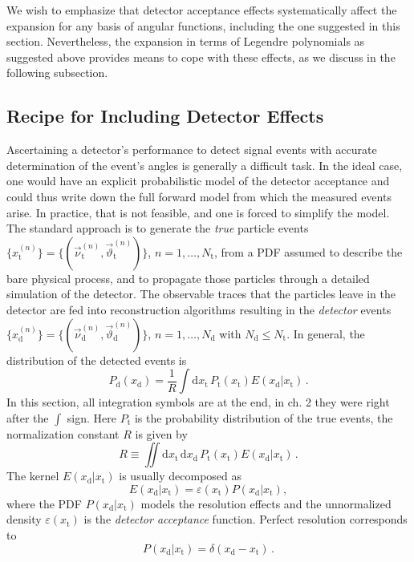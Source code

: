 \documentclass[aps,nofootinbib,preprintnumbers,prd,twocolumn]{revtex4-1}
\newcommand{\rmdx}[1]{\mbox{d} #1 \,} %
\newcommand{\subd}{_{\text{d}}}
\newcommand{\subt}{_{\text{t}}}
\renewcommand{\theta}{\vartheta}
\let\eps\varepsilon
\newcommand{\xd}{x\subd}
\newcommand{\xt}{x\subt}
\newcommand{\Ekernel}{E(\xd|\xt)}
\newcommand{\fred}[1]{{\color{brown!85!black}#1}}
\begin{document}
We wish to emphasize that detector acceptance effects systematically affect the expansion for any basis
of angular functions, including the one suggested in this section.
Nevertheless, the expansion in terms of Legendre polynomials as suggested above provides means to cope with these effects,
as we discuss in the following subsection.


\subsection{Recipe for Including Detector Effects}
\label{sec:systematics:acceptance}

Ascertaining a detector's performance to detect signal events
with accurate determination of the event's angles is generally a
difficult task. In the ideal case, one would have an explicit
probabilistic model of the detector acceptance and could thus
write down the full forward model from which the measured events
arise. In practice, that is not feasible, and one is
forced to simplify the model.
The standard approach is to generate the \emph{true} particle events
$\lbrace x_\text{t}^{(n)}\rbrace =
\lbrace(\vec{\nu}^{(n)}_\text{t},\vec\theta^{(n)}_\text{t})\rbrace$,
$n=1,\dots,N_\text{t}$, from a PDF assumed to describe the bare
physical process, and to propagate those particles through a detailed
simulation of the detector.  The observable traces that the particles
leave in the detector are fed into reconstruction algorithms resulting
in the \emph{detector} events $\lbrace x^{(n)}_\text{d}\rbrace =
\lbrace(\vec{\nu}^{(n)}_\text{d}, \vec\theta^{(n)}_\text{d})\rbrace$,
$n=1,\dots,N_\text{d}$ with $N_\text{d} \le N_\text{t}$.  In general,
the distribution of the detected events is
\begin{equation}
    P_\text{d}(x_\text{d}) = \frac{1}{R} \int \rmdx{x_\text{t}} P_\text{t}(x_\text{t}) E(x_\text{d} | x_\text{t}) \,.
\end{equation}
\fred{In this section, all integration symbols are at the end, in ch. 2 they were right after the $\int$ sign.}
Here $P_\text{t}$ is the probability distribution of the true events,
the normalization constant $R$ is given by
\begin{equation}
  \label{eq:def-R}
    R \equiv \iint \rmdx{x_\text{t}} \rmdx{x_\text{d}} P_\text{t}(x_\text{t}) E(x_\text{d} | x_\text{t})\,.
\end{equation}
The kernel $E(x_\text{d}| x_\text{t})$ is usually decomposed as
\begin{equation}
  \Ekernel = \eps(\xt) P(\xd|\xt),
\end{equation}
where the PDF $P(\xd|\xt)$ models the resolution effects and the
unnormalized density $\eps(\xt)$ is the \emph{detector acceptance}
function. Perfect resolution corresponds to
\begin{equation}
  P(\xd|\xt) = \delta(\xd - \xt) \,.
\end{equation}
\end{document}

